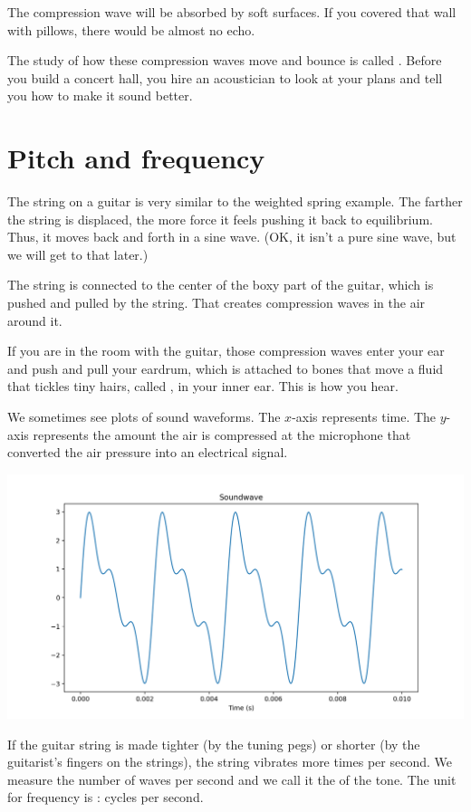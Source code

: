 The compression wave will be absorbed by soft surfaces. If you covered
that wall with pillows, there would be almost no echo.

The study of how these compression waves move and bounce is called
. Before you build a concert hall, you hire an
acoustician to look at your plans and tell you how to make it sound
better.

\section{Pitch and frequency}

The string on a guitar is very similar to the weighted spring
example. The farther the string is displaced, the more force it feels
pushing it back to equilibrium. Thus, it moves back and forth in a
sine wave. (OK, it isn't a pure sine wave, but we will get to that later.)

The string is connected to the center of the boxy part of the guitar,
which is pushed and pulled by the string. That creates compression
waves in the air around it.

If you are in the room with the guitar, those compression waves enter
your ear and push and pull your eardrum, which is attached to bones that
move a fluid that tickles tiny hairs, called , in your
inner ear. This is how you hear.

We sometimes see plots of sound waveforms.  The $x$-axis represents
time. The $y$-axis represents the amount the air is compressed at the
microphone that converted the air pressure into an electrical signal.

\includegraphics[width=0.8\linewidth]{soundwave.png}

If the guitar string is made tighter (by the tuning pegs) or shorter
(by the guitarist's fingers on the strings), the string vibrates more
times per second.  We measure the number of waves per second and we
call it the  of the tone. The unit for frequency is
: cycles per second.

